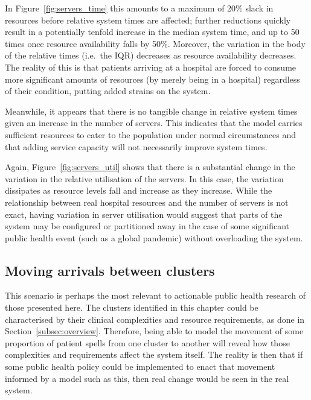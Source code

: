 In Figure~\ref{fig:servers_time} this amounts to a maximum of 20\% slack in
resources before relative system times are affected; further reductions quickly
result in a potentially tenfold increase in the median system time, and up to 50
times once resource availability falls by 50\%. Moreover, the variation in the
body of the relative times (i.e.\ the IQR) decreases as resource availability
decreases. The reality of this is that patients arriving at a hospital are
forced to consume more significant amounts of resources (by merely being in a
hospital) regardless of their condition, putting added strains on the system.

Meanwhile, it appears that there is no tangible change in relative system times
given an increase in the number of servers. This indicates that the model
carries sufficient resources to cater to the population under normal
circumstances and that adding service capacity will not necessarily improve
system times.

Again, Figure~\ref{fig:servers_util} shows that there is a substantial change in
the variation in the relative utilisation of the servers. In this case, the
variation dissipates as resource levels fall and increase as they increase.
While the relationship between real hospital resources and the number of servers
is not exact, having variation in server utilisation would suggest that parts of
the system may be configured or partitioned away in the case of some significant
public health event (such as a global pandemic) without overloading the system.


\subsection{Moving arrivals between clusters}\label{subsec:moving}

This scenario is perhaps the most relevant to actionable public health research
of those presented here. The clusters identified in this chapter could be
characterised by their clinical complexities and resource requirements, as done
in Section~\ref{subsec:overview}. Therefore, being able to model the movement of
some proportion of patient spells from one cluster to another will reveal how
those complexities and requirements affect the system itself. The reality is
then that if some public health policy could be implemented to enact that
movement informed by a model such as this, then real change would be seen in the
real system.


